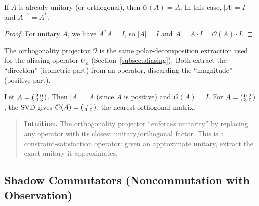 \begin{corollary}
\label{cor:orthogonality-fixed}
If $A$ is already unitary (or orthogonal), then $\mathcal{O}(A) = A$.
In this case, $|A| = I$ and $A^{-1} = A^*$.
\end{corollary}

\begin{proof}
For unitary $A$, we have $A^* A = I$, so $|A| = I$ and $A = A \cdot I = \mathcal{O}(A) \cdot I$.
\end{proof}

\begin{remark}
The orthogonality projector $\mathcal{O}$ is the same polar-decomposition extraction used for the aliasing operator $U_h$ (Section~\ref{subsec:aliasing}).
Both extract the ``direction'' (isometric part) from an operator, discarding the ``magnitude'' (positive part).
\end{remark}

\begin{example}
\label{ex:orthogonality-2x2}
Let $A = \begin{psmallmatrix} 2 & 0 \\ 0 & 3 \end{psmallmatrix}$.
Then $|A| = A$ (since $A$ is positive) and $\mathcal{O}(A) = I$.
For $A = \begin{psmallmatrix} 0 & 2 \\ 3 & 0 \end{psmallmatrix}$, the SVD gives $\mathcal{O}(A) = \begin{psmallmatrix} 0 & 1 \\ 1 & 0 \end{psmallmatrix}$, the nearest orthogonal matrix.
\end{example}

\begin{quote}\small
\textbf{Intuition.}
The orthogonality projector ``enforces unitarity'' by replacing any operator with its closest unitary/orthogonal factor.
This is a constraint-satisfaction operator: given an approximate unitary, extract the exact unitary it approximates.
\end{quote}

\subsection{Shadow Commutators (Noncommutation with Observation)}
\label{subsec:shadow-commutator}

